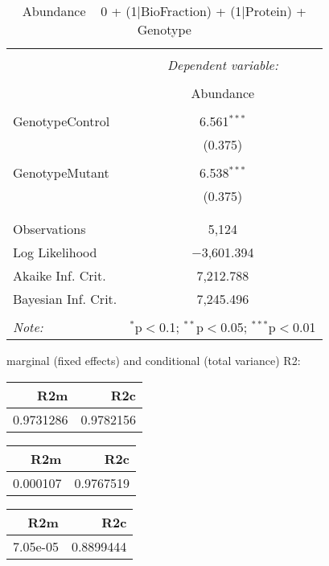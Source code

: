 \documentclass[11pt]{report}
\begin{document}
\begin{table}[!htbp] \centering 
  \caption{Abundance ~ 0 + (1|BioFraction) + (1|Protein) + Genotype} 
  \label{} 
\begin{tabular}{@{\extracolsep{5pt}}lc} 
\\[-1.8ex]\hline 
\hline \\[-1.8ex] 
 & \multicolumn{1}{c}{\textit{Dependent variable:}} \\ 
\cline{2-2} 
\\[-1.8ex] & Abundance \\ 
\hline \\[-1.8ex] 
 GenotypeControl & 6.561$^{***}$ \\ 
  & (0.375) \\ 
  & \\ 
 GenotypeMutant & 6.538$^{***}$ \\ 
  & (0.375) \\ 
  & \\ 
\hline \\[-1.8ex] 
Observations & 5,124 \\ 
Log Likelihood & $-$3,601.394 \\ 
Akaike Inf. Crit. & 7,212.788 \\ 
Bayesian Inf. Crit. & 7,245.496 \\ 
\hline 
\hline \\[-1.8ex] 
\textit{Note:}  & \multicolumn{1}{r}{$^{*}$p$<$0.1; $^{**}$p$<$0.05; $^{***}$p$<$0.01} \\ 
\end{tabular} 
\end{table} 
marginal (fixed effects) and conditional (total variance) R2:

\begin{tabular}{r|r}
\hline
R2m & R2c\\
\hline
0.9731286 & 0.9782156\\
\hline
\end{tabular}

\begin{tabular}{r|r}
\hline
R2m & R2c\\
\hline
0.000107 & 0.9767519\\
\hline
\end{tabular}

\begin{tabular}{r|r}
\hline
R2m & R2c\\
\hline
7.05e-05 & 0.8899444\\
\hline
\end{tabular}
\end{document}
